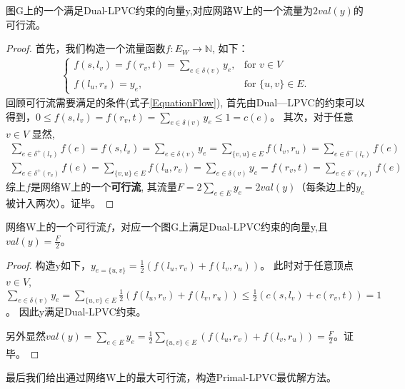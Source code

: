 \begin{property}
图G上的一个满足Dual-LPVC约束的向量y,对应网路W上的一个流量为$2val(y)$的可行流。
\end{property}
\begin{proof}
  首先，我们构造一个流量函数$f:E_W \rightarrow \mathbb{N}$, 如下：
  \begin{equation*}\begin{aligned} \begin{cases}
    f(s, l_v) = f(r_v, t) = \sum\limits_{e \in \delta(v)}{y_e}, & \mbox{for } v \in V \\
    f(l_u, r_v) = y_e, & \mbox{for } \{u, v\} \in E.
  \end{cases}\end{aligned}\end{equation*}
  回顾可行流需要满足的条件(式子\ref{EquationFlow}), 首先由Dual—LPVC的约束可以得到，$0 \le f(s, l_v) = f(r_v, t) = \sum\limits_{e \in \delta(v)}{y_e} \le 1 = c(e)$。
  其次，对于任意$v \in V$ 显然,
  \[ \begin{aligned}
     \sum_{e\in \delta^+(l_v)}{f(e)} = f(s, l_v) = \sum\limits_{e \in \delta(v)}{y_e} = \sum_{\{v, u\} \in E}{f(l_v, r_u)} = \sum_{e\in \delta^-(l_v)}{f(e)} \\
    \sum_{e\in \delta^+(r_v)}{f(e)} = \sum_{\{v, u\} \in E}{f(l_u, r_v)}  = \sum\limits_{e \in \delta(v)}{y_e} = f(r_v, t) = \sum_{e\in \delta^-(r_v)}{f(e)}
  \end{aligned} \]
  综上$f$是网络W上的一个\textbf{可行流}, 其流量$F = 2\sum_{e \in E}{y_e} = 2val(y)$（每条边上的$y_e$被计入两次）。证毕。
\end{proof}

\begin{property}
网络W上的一个可行流$f$，对应一个图G上满足Dual-LPVC约束的向量y,且$val(y) = \frac{F}{2}$。
\end{property}
\begin{proof}
构造y如下，$y_{e = \{u, v\}} = \frac{1}{2}(f(l_u, r_v) + f(l_v, r_u))$。
此时对于任意顶点$v \in V$, $\sum\limits_{e \in \delta(v)}{y_e} = \sum\limits_{\{u, v\}\in E}{\frac{1}{2}(f(l_u, r_v) + f(l_v, r_u))} \le \frac{1}{2}(c(s, l_v) + c(r_v, t)) = 1$。
因此y满足Dual-LPVC约束。

另外显然$val(y) = \sum_{e \in E}{y_e} = \frac{1}{2}\sum\limits_{\{u, v\}\in E}{(f(l_u, r_v) + f(l_v, r_u))} = \frac{F}{2}$。证毕。
\end{proof}

最后我们给出通过网络W上的最大可行流，构造Primal-LPVC最优解方法。

